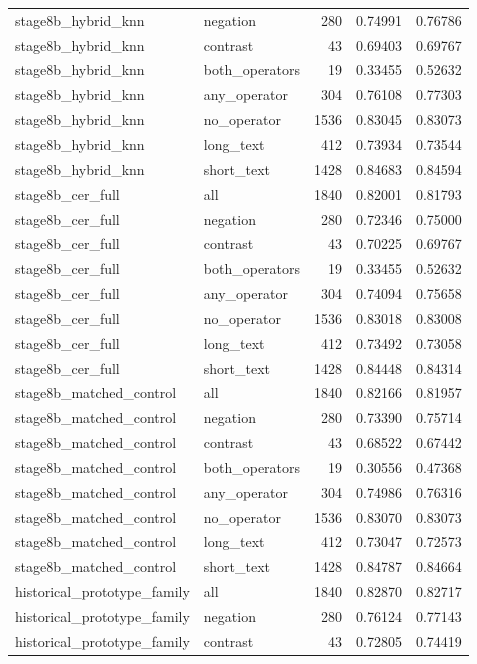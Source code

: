 \begin{tabular}{llrrr}
stage8b_hybrid_knn & negation & 280 & 0.74991 & 0.76786 \\
stage8b_hybrid_knn & contrast & 43 & 0.69403 & 0.69767 \\
stage8b_hybrid_knn & both_operators & 19 & 0.33455 & 0.52632 \\
stage8b_hybrid_knn & any_operator & 304 & 0.76108 & 0.77303 \\
stage8b_hybrid_knn & no_operator & 1536 & 0.83045 & 0.83073 \\
stage8b_hybrid_knn & long_text & 412 & 0.73934 & 0.73544 \\
stage8b_hybrid_knn & short_text & 1428 & 0.84683 & 0.84594 \\
stage8b_cer_full & all & 1840 & 0.82001 & 0.81793 \\
stage8b_cer_full & negation & 280 & 0.72346 & 0.75000 \\
stage8b_cer_full & contrast & 43 & 0.70225 & 0.69767 \\
stage8b_cer_full & both_operators & 19 & 0.33455 & 0.52632 \\
stage8b_cer_full & any_operator & 304 & 0.74094 & 0.75658 \\
stage8b_cer_full & no_operator & 1536 & 0.83018 & 0.83008 \\
stage8b_cer_full & long_text & 412 & 0.73492 & 0.73058 \\
stage8b_cer_full & short_text & 1428 & 0.84448 & 0.84314 \\
stage8b_matched_control & all & 1840 & 0.82166 & 0.81957 \\
stage8b_matched_control & negation & 280 & 0.73390 & 0.75714 \\
stage8b_matched_control & contrast & 43 & 0.68522 & 0.67442 \\
stage8b_matched_control & both_operators & 19 & 0.30556 & 0.47368 \\
stage8b_matched_control & any_operator & 304 & 0.74986 & 0.76316 \\
stage8b_matched_control & no_operator & 1536 & 0.83070 & 0.83073 \\
stage8b_matched_control & long_text & 412 & 0.73047 & 0.72573 \\
stage8b_matched_control & short_text & 1428 & 0.84787 & 0.84664 \\
historical_prototype_family & all & 1840 & 0.82870 & 0.82717 \\
historical_prototype_family & negation & 280 & 0.76124 & 0.77143 \\
historical_prototype_family & contrast & 43 & 0.72805 & 0.74419 \\

\end{tabular}
